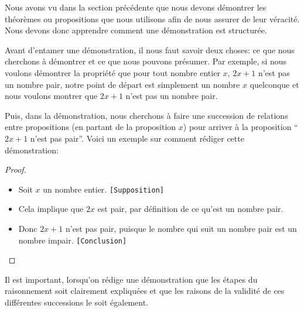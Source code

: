 Nous avons vu dans la section précédente que nous devons démontrer les théorèmes ou propositions que nous utilisons afin de nous assurer de leur véracité. Nous devons donc apprendre comment une démonstration est structurée.

Avant d'entamer une démonstration, il nous faut savoir deux choses: ce que nous cherchons à démontrer et ce que nous pouvons présumer. Par exemple, si nous voulons démontrer la propriété que pour tout nombre entier $x$, $2x + 1$ n'est pas un nombre pair, notre point de départ est simplement un nombre $x$ quelconque et nous voulons montrer que $2x + 1$ n'est pas un nombre pair.

Puis, dans la démonstration, nous cherchons à faire une succession de relations entre propositions (en partant de la proposition $x$) pour arriver à la proposition ``$2x+1$ n'est pas pair''. Voici un exemple sur comment rédiger cette démonstration:
\begin{proof}
    \hfill
    \begin{itemize}
        \item Soit $x$ un nombre entier. \texttt{[Supposition]}
        \item Cela implique que $2x$ est pair, par définition de ce qu'est un nombre pair.
        \item Donc $2x+1$ n'est pas pair, puisque le nombre qui suit un nombre pair est un nombre impair. \texttt{[Conclusion]} \qedhere
    \end{itemize}
\end{proof}

Il est important, lorsqu'on rédige une démonstration que les étapes du raisonnement soit clairement expliquées et que les raisons de la validité de ces différentes successions le soit également.